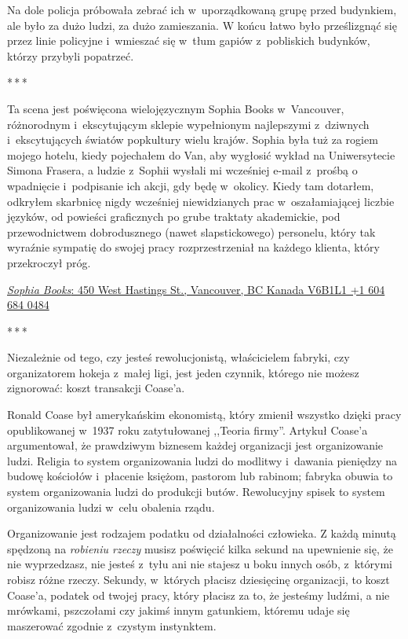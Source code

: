 \documentclass[oneside,polish,11pt,rmheadings]{mwbk}
\newcommand{\threeast}{\par\centerline{*\,*\,*}\medskip\par}
\begin{document}
Na dole policja próbowała zebrać ich w~uporządkowaną grupę przed budynkiem, ale było za dużo ludzi, za dużo zamieszania. W końcu łatwo było prześlizgnąć się przez linie policyjne i~wmieszać się w~tłum gapiów z~pobliskich budynków, którzy przybyli popatrzeć.

\bigskip
\threeast

Ta scena jest poświęcona wielojęzycznym Sophia Books w~Vancouver, różnorodnym i~ekscytującym sklepie wypełnionym najlepszymi z~dziwnych i~ekscytujących światów popkultury wielu krajów. Sophia była tuż za rogiem mojego hotelu, kiedy pojechałem do Van, aby wygłosić wykład na Uniwersytecie Simona Frasera, a ludzie z~Sophii wysłali mi wcześniej e-mail z~prośbą o wpadnięcie i~podpisanie ich akcji, gdy będę w~okolicy. Kiedy tam dotarłem, odkryłem skarbnicę nigdy wcześniej niewidzianych prac w~oszałamiającej liczbie języków, od powieści graficznych po grube traktaty akademickie, pod przewodnictwem dobrodusznego (nawet slapstickowego) personelu, który tak wyraźnie sympatię do swojej pracy rozprzestrzeniał na każdego klienta, który przekroczył próg.

\href{https://en.wikipedia.org/wiki/HTTP_404}{\textit{Sophia Books}: 450 West Hastings St., Vancouver, BC Kanada V6B1L1 +1 604 684 0484} 


\bigskip
\threeast


Niezależnie od tego, czy jesteś rewolucjonistą, właścicielem fabryki, czy organizatorem hokeja z~małej ligi, jest jeden czynnik, którego nie możesz zignorować: koszt transakcji Coase'a.

Ronald Coase był amerykańskim ekonomistą, który zmienił wszystko dzięki pracy opublikowanej w~1937 roku zatytułowanej ,,Teoria firmy''. Artykuł Coase'a argumentował, że prawdziwym biznesem każdej organizacji jest organizowanie ludzi. Religia to system organizowania ludzi do modlitwy i~dawania pieniędzy na budowę kościołów i~płacenie księżom, pastorom lub rabinom; fabryka obuwia to system organizowania ludzi do produkcji butów. Rewolucyjny spisek to system organizowania ludzi w~celu obalenia rządu.

Organizowanie jest rodzajem podatku od działalności człowieka. Z każdą minutą spędzoną na \textit{robieniu rzeczy }musisz poświęcić kilka sekund na upewnienie się, że nie wyprzedzasz, nie jesteś z~tyłu ani nie stajesz u boku innych osób, z~którymi robisz różne rzeczy. Sekundy, w~których płacisz dziesięcinę organizacji, to koszt Coase'a, podatek od twojej pracy, który płacisz za to, że jesteśmy ludźmi, a nie mrówkami, pszczołami czy jakimś innym gatunkiem, któremu udaje się maszerować zgodnie z~czystym instynktem.
\end{document}
